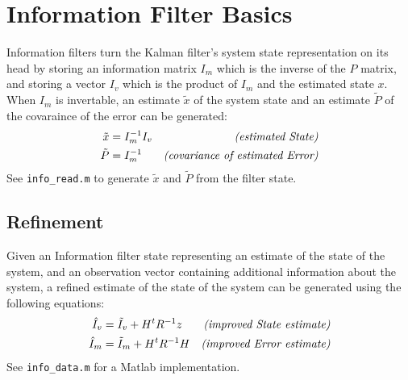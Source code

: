 \section{Information Filter Basics}

Information filters turn the Kalman filter's system state
representation on its head by storing an information matrix $I_m$
which is the inverse of the $P$ matrix, and storing a vector $I_v$
which is the product of $I_m$ and the estimated state $x$.
When $I_m$ is invertable,
an estimate ${\tilde x}$ of the system state
and an estimate ${\tilde P}$ of the covaraince of the error
can be generated:
\begin{subequations}
\label{inforead}
\begin{align}
  {\tilde x} & = I_m^{-1} I_v
  & \mbox{\it (estimated State)}
\label{inforeadx}
\\
 {\tilde P} & = I_m^{-1}
  & \mbox{\it (covariance of estimated Error)}
\label{inforeadp}
\end{align}
\end{subequations}
See \verb|info_read.m|
to generate ${\tilde x}$ and ${\tilde P}$
from the filter state.

\subsection{Refinement}
Given an Information filter state
representing an estimate of the state of the system,
and an observation vector containing additional information
about the system,
a refined estimate of the state of the system
can be generated using the following equations:
\begin{subequations}
\label{infodata}
\begin{align}
  {\hat I_v} & = {\tilde I_v} + H^t R^{-1} z
  & \mbox{\it (improved State estimate)}
\label{infodatad}
\\
  {\hat I_m} & = {\tilde I_m} + H^t R^{-1} H
  & \mbox{\it (improved Error estimate)}
\label{infodatal}
\end{align}
\end{subequations}
See \verb|info_data.m|
for a Matlab implementation.

